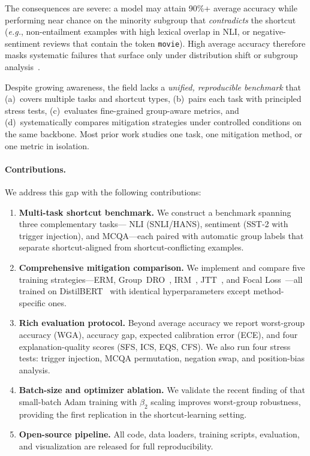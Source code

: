 \documentclass[10pt,twocolumn]{article}
\newcommand{\eg}{\emph{e.g.}\xspace}
\begin{document}
The consequences are severe: a model may attain 90\%+
average accuracy while performing near chance on the
minority subgroup that \emph{contradicts} the shortcut
(\eg, non-entailment examples with high lexical overlap in
NLI, or negative-sentiment reviews that contain the token
\texttt{movie}).
High average accuracy therefore masks systematic failures
that surface only under distribution shift or subgroup
analysis~\citep{sagawa2020distributionally}.

Despite growing awareness, the field lacks a
\emph{unified, reproducible benchmark} that
(a)~covers multiple tasks and shortcut types,
(b)~pairs each task with principled stress tests,
(c)~evaluates fine-grained group-aware metrics, and
(d)~systematically compares mitigation strategies under
controlled conditions on the same backbone.
Most prior work studies one task, one mitigation method, or one
metric in isolation.

\paragraph{Contributions.}
We address this gap with the following contributions:

\begin{enumerate}[leftmargin=*,itemsep=2pt]
\item \textbf{Multi-task shortcut benchmark.}
  We construct a benchmark spanning three complementary tasks---
  NLI (SNLI/HANS), sentiment (SST-2 with trigger injection), and
  MCQA---each paired with automatic group labels that separate
  shortcut-aligned from shortcut-conflicting examples.

\item \textbf{Comprehensive mitigation comparison.}
  We implement and compare five training strategies---ERM,
  Group~DRO~\citep{sagawa2020distributionally},
  IRM~\citep{arjovsky2019invariant},
  JTT~\citep{liu2021just}, and
  Focal Loss~\citep{lin2017focal}---all trained on
  DistilBERT~\citep{sanh2019distilbert} with identical
  hyperparameters except method-specific ones.

\item \textbf{Rich evaluation protocol.}
  Beyond average accuracy we report worst-group accuracy (WGA),
  accuracy gap, expected calibration error (ECE), and four
  explanation-quality scores (SFS, ICS, EQS, CFS).
  We also run four stress tests: trigger injection,
  MCQA permutation, negation swap, and position-bias analysis.

\item \textbf{Batch-size and optimizer ablation.}
  We validate the recent finding of \citet{marek2025scaling}
  that small-batch Adam training with $\beta_2$ scaling
  improves worst-group robustness, providing the first
  replication in the shortcut-learning setting.

\item \textbf{Open-source pipeline.}
  All code, data loaders, training scripts, evaluation, and
  visualization are released for full reproducibility.
\end{enumerate}
\end{document}

